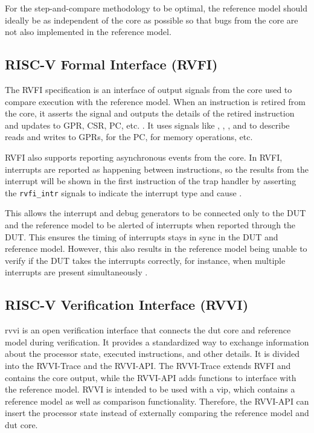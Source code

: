 For the step-and-compare methodology to be optimal, the reference model should ideally be as independent of the core as possible so that bugs from the core are not also implemented in the reference model.

\subsection{RISC-V Formal Interface (RVFI)}
\label{sec:rvfi}

The RVFI specification is an interface of output signals from the core used to compare execution with the reference model. 
When an instruction is retired from the core, it asserts the  signal and outputs the details of the retired instruction and updates to GPR, CSR, PC, etc. \cite{symbioticedaRiscvformalDocsRvfi2020}. It uses signals like \mbox{,} , , and  to describe reads and writes to GPRs,  for the PC,  for memory operations, etc.

RVFI also supports reporting asynchronous events from the core. In RVFI, interrupts are reported as happening between instructions, so the results from the interrupt will be shown in the first instruction of the trap handler by asserting the \lstinline{rvfi_intr} signals to indicate the interrupt type and cause \cite{openhwgroupRISCVFormalInterface2023}.

This allows the interrupt and debug generators to be connected only to the DUT and the reference model to be alerted of interrupts when reported through the DUT.
This ensures the timing of interrupts stays in sync in the DUT and reference model. However, this also results in the reference model being unable to verify if the DUT takes the interrupts correctly, for instance, when multiple interrupts are present simultaneously \cite{taylorAdvancedRISCVVerification2023}.

\subsection{RISC-V Verification Interface (RVVI)}
\label{sec:rvvi}

\acrfull{rvvi} \cite{riscv-verificationRISCVVerificationInterface2023} is an open verification interface that connects the \acrshort{dut} core and reference model during verification. It provides a standardized way to exchange information about the processor state, executed instructions, and other details. It is divided into the RVVI-Trace and the RVVI-API. The RVVI-Trace extends RVFI and contains the core output, while the RVVI-API adds functions to interface with the reference model. RVVI is intended to be used with a \acrshort{vip}, which contains a reference model as well as comparison functionality. Therefore, the RVVI-API can insert the processor state instead of externally comparing the reference model and \acrshort{dut} core.

